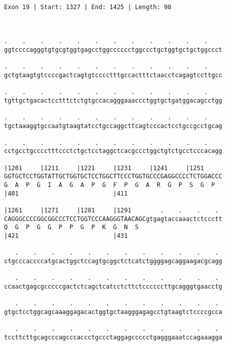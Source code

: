 \documentclass{article}
\begin{document}
\begin{Verbatim}
                                             
 
Exon 19 | Start: 1327 | End: 1425 | Length: 98



.    .    .    .    .    .    .    .    .    .    .    .    
ggtccccagggtgtgcgtggtgagcctggcccccctggccctgctggtgctgctggccct
                                                            
.    .    .    .    .    .    .    .    .    .    .    .    
gctgtaagtgtccccgactcagtgtcccctttgccactttctaacctcagagtccttgcc
                                                            
.    .    .    .    .    .    .    .    .    .    .    .    
tgttgctgacactcctttctctgtgccacagggaaaccctggtgctgatggacagcctgg
                                                            
.    .    .    .    .    .    .    .    .    .    .    .    
tgctaaaggtgccaatgtaagtatcctgccaggcttcagtcccactcctgccgcctgcag
                                                            
.    .    .    .    .    .    .    .    .    .    .    .    
cctgcctgcccctttccctctgctcctaggctcacgccctggctgtctgcctcccacagg
                                                            
|1201     |1211     |1221     |1231     |1241     |1251     
GGTGCTCCTGGTATTGCTGGTGCTCCTGGCTTCCCTGGTGCCCGAGGCCCCTCTGGACCC
G  A  P  G  I  A  G  A  P  G  F  P  G  A  R  G  P  S  G  P  
|401                          |411                          
  
|1261     |1271     |1281     |1291        .    .    .    . 
CAGGGCCCCGGCGGCCCTCCTGGTCCCAAGGGTAACAGCgtgagtaccaaactctccctt
Q  G  P  G  G  P  P  G  P  K  G  N  S                       
|421                          |431                          
  
   .    .    .    .    .    .    .    .    .    .    .    . 
ctgcccaccccatgcactggctccagtgcggctctcatctggggagcaggaagacgcagg
                                                            
   .    .    .    .    .    .    .    .    .    .    .    . 
ccaactgagcgcccccgactctcagctcatcctcttctccccccttgcagggtgaacctg
                                                            
   .    .    .    .    .    .    .    .    .    .    .    . 
gtgctcctggcagcaaaggagacactggtgctaagggagagcctgtaagtctccccgcca
                                                            
   .    .    .    .    .    .    .    .    .    .    .    . 
tccttcttgcagcccagcccaccctgccctaggagccccctgagggaaatccagaaagga
                                                            

\end{Verbatim}
\end{document}
